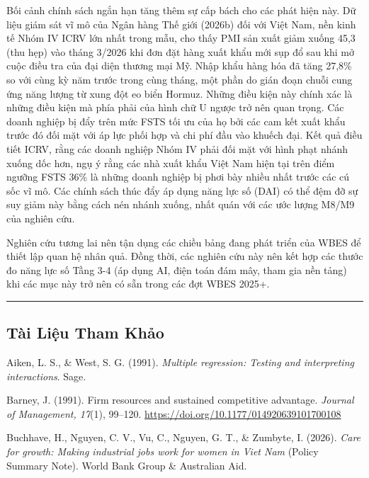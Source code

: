 \documentclass[12pt,a4paper]{article}
\begin{document}
Bối cảnh chính sách ngắn hạn tăng thêm sự cấp bách cho các phát hiện
này. Dữ liệu giám sát vĩ mô của Ngân hàng Thế giới (2026b) đối với Việt
Nam, nền kinh tế Nhóm IV ICRV lớn nhất trong mẫu, cho thấy PMI sản xuất
giảm xuống 45,3 (thu hẹp) vào tháng 3/2026 khi đơn đặt hàng xuất khẩu
mới sụp đổ sau khi mở cuộc điều tra của đại diện thương mại Mỹ. Nhập
khẩu hàng hóa đã tăng 27,8\% so với cùng kỳ năm trước trong cùng tháng,
một phần do gián đoạn chuỗi cung ứng năng lượng từ xung đột eo biển
Hormuz. Những điều kiện này chính xác là những điều kiện mà phía phải
của hình chữ U ngược trở nên quan trọng. Các doanh nghiệp bị đẩy trên
mức FSTS tối ưu của họ bởi các cam kết xuất khẩu trước đó đối mặt với áp
lực phối hợp và chi phí đầu vào khuếch đại. Kết quả điều tiết ICRV, rằng
các doanh nghiệp Nhóm IV phải đối mặt với hình phạt nhánh xuống dốc hơn,
ngụ ý rằng các nhà xuất khẩu Việt Nam hiện tại trên điểm ngưỡng FSTS
36\% là những doanh nghiệp bị phơi bày nhiều nhất trước các cú sốc vĩ
mô. Các chính sách thúc đẩy áp dụng năng lực số (DAI) có thể đệm đỡ sự
suy giảm này bằng cách nén nhánh xuống, nhất quán với các ước lượng
M8/M9 của nghiên cứu.

Nghiên cứu tương lai nên tận dụng các chiều bảng đang phát triển của
WBES để thiết lập quan hệ nhân quả. Đồng thời, các nghiên cứu này nên
kết hợp các thước đo năng lực số Tầng 3-4 (áp dụng AI, điện toán đám
mây, tham gia nền tảng) khi các mục này trở nên có sẵn trong các đợt
WBES 2025+.

\begin{center}\rule{0.5\linewidth}{0.5pt}\end{center}

\hypertarget{tuxe0i-liux1ec7u-tham-khux1ea3o}{%
\subsection{Tài Liệu Tham Khảo}\label{tuxe0i-liux1ec7u-tham-khux1ea3o}}

Aiken, L. S., \& West, S. G. (1991). \emph{Multiple regression: Testing
and interpreting interactions}. Sage.

Barney, J. (1991). Firm resources and sustained competitive advantage.
\emph{Journal of Management, 17}(1), 99--120.
\url{https://doi.org/10.1177/014920639101700108}

Buchhave, H., Nguyen, C. V., Vu, C., Nguyen, G. T., \& Zumbyte, I.
(2026). \emph{Care for growth: Making industrial jobs work for women in
Viet Nam} (Policy Summary Note). World Bank Group \& Australian Aid.
\end{document}
